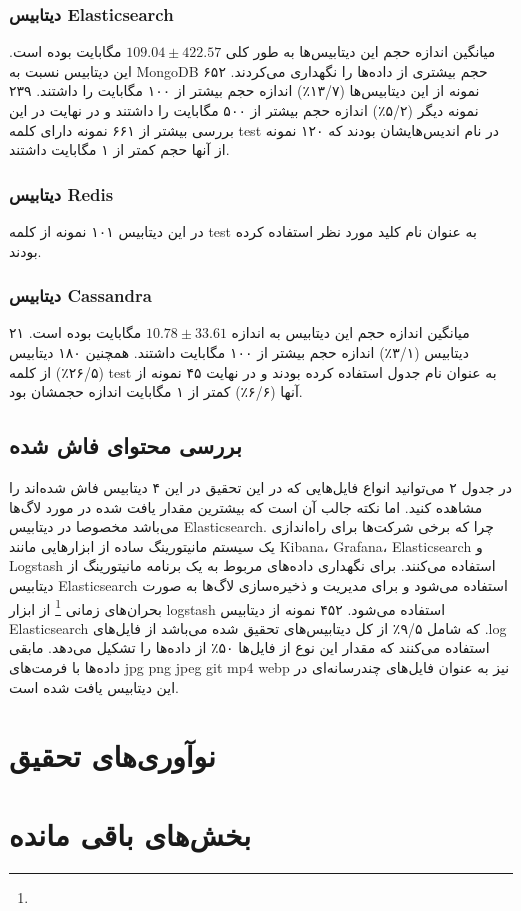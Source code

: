 \documentclass[10pt, a4paper]{article}
\begin{document}
\subsubsection{دیتابیس Elasticsearch}

میانگین اندازه حجم این دیتابیس‌ها به طور کلی $ 109.04 \pm 422.57 $ مگابایت بوده
است. این دیتابیس نسبت به MongoDB حجم بیشتری از داده‌ها را نگهداری می‌کردند. ۶۵۲
نمونه از این دیتابیس‌ها (۱۳/۷٪) اندازه حجم بیشتر از ۱۰۰ مگابایت را داشتند. ۲۳۹
نمونه‌ دیگر (۵/۲٪) اندازه حجم بیشتر از ۵۰۰ مگابایت را داشتند و در نهایت در این
بررسی بیشتر از ۶۶۱ نمونه دارای کلمه test در نام اندیس‌هایشان بودند که ۱۲۰ نمونه
از آنها حجم کمتر از ۱ مگابایت داشتند.

\subsubsection{دیتابیس Redis}

در این دیتابیس ۱۰۱ نمونه از کلمه test به عنوان نام کلید مورد نظر استفاده کرده
بودند.

\subsubsection{دیتابیس Cassandra}

میانگین اندازه حجم این دیتابیس به اندازه $ 10.78 \pm 33.61 $ مگابایت بوده است.
۲۱ دیتابیس (۳/۱٪) اندازه حجم بیشتر از ۱۰۰ مگابایت داشتند. همچنین ۱۸۰ دیتابیس
(۲۶/۵٪) از کلمه test به عنوان نام جدول استفاده کرده بودند و در نهایت ۴۵ نمونه از
آنها (۶/۶٪) کمتر از ۱ مگابایت اندازه حجمشان بود. 

\subsection{بررسی محتوای فاش شده}

در جدول ۲ می‌توانید انواع فایل‌هایی که در این تحقیق در این ۴ دیتابیس فاش شده‌اند
را مشاهده کنید. اما نکته جالب آن است که بیشترین مقدار یافت شده در مورد لاگ‌ها
می‌باشد مخصوصا در دیتابیس Elasticsearch. چرا که برخی شرکت‌ها برای راه‌اندازی یک
سیستم مانیتورینگ ساده از ابزار‌هایی مانند Kibana، Grafana، Elasticsearch و
Logstash استفاده می‌کنند. برای نگهداری داده‌های مربوط به یک برنامه مانیتورینگ از
دیتابیس Elasticsearch استفاده می‌شود و برای مدیریت و ذخیره‌سازی لاگ‌ها به صورت
بحران‌های زمانی \footnote{} از ابزار logstash استفاده
می‌شود. ۴۵۲ نمونه از دیتابیس Elasticsearch که شامل ۹/۵٪ از کل دیتابیس‌های تحقیق
شده می‌باشد از فایل‌های .log استفاده می‌کنند که مقدار این نوع از فایل‌ها ۵۰٪ از
داده‌ها را تشکیل می‌دهد. مابقی داده‌ها با فرمت‌های jpg png jpeg git mp4 webp نیز
به عنوان فایل‌های چندرسانه‌ای در این دیتابیس یافت شده است.

\section{نوآوری‌های تحقیق}

\section{بخش‌های باقی مانده}
\end{document}
